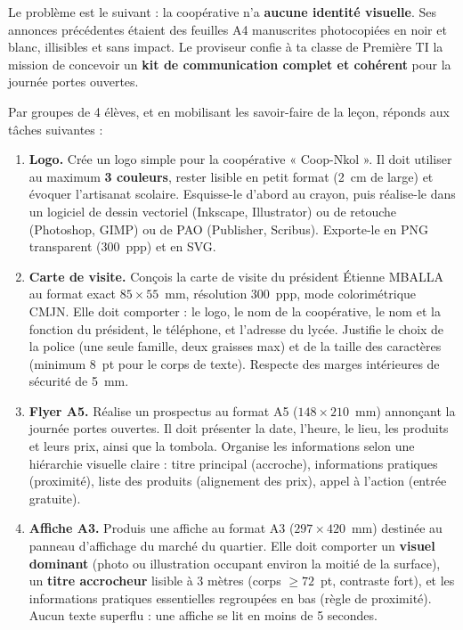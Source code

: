 \documentclass[11pt]{article}
\newcommand{\cle}[1]{{\popxbold\color{popdark}#1}}
\newcounter{popsec}
\newcounter{popsub}
\newcommand{\courssub}[1]{%
  \stepcounter{popsub}%
  \par\vspace{9pt}\noindent{\popxbold\fontsize{11.5}{13}\selectfont\color{popink}{\color{poporange}\thepopsec.\thepopsub}\hspace{6pt}#1}\par\nopagebreak\vspace{4pt}
}
\begin{document}
Le problème est le suivant : la coopérative n'a \textbf{aucune identité visuelle}. Ses annonces précédentes étaient des feuilles A4 manuscrites photocopiées en noir et blanc, illisibles et sans impact. Le proviseur confie à ta classe de Première TI la mission de concevoir un \textbf{kit de communication complet et cohérent} pour la journée portes ouvertes.

\courssub{Consignes}

Par groupes de 4 élèves, et en mobilisant les savoir-faire de la leçon, réponds aux tâches suivantes :

\begin{enumerate}
  \item \textbf{Logo.} Crée un logo simple pour la coopérative « Coop-Nkol ». Il doit utiliser au maximum \textbf{3 couleurs}, rester lisible en petit format (2~cm de large) et évoquer l'artisanat scolaire. Esquisse-le d'abord au crayon, puis réalise-le dans un logiciel de dessin vectoriel (Inkscape, Illustrator) ou de retouche (Photoshop, GIMP) ou de PAO (Publisher, Scribus). Exporte-le en PNG transparent (300~ppp) et en SVG.
  \item \textbf{Carte de visite.} Conçois la carte de visite du président Étienne MBALLA au format exact $85 \times 55$~mm, résolution 300~ppp, mode colorimétrique CMJN. Elle doit comporter : le logo, le nom de la coopérative, le nom et la fonction du président, le téléphone, et l'adresse du lycée. Justifie le choix de la police (une seule famille, deux graisses max) et de la taille des caractères (minimum 8~pt pour le corps de texte). Respecte des marges intérieures de sécurité de 5~mm.
  \item \textbf{Flyer A5.} Réalise un prospectus au format A5 ($148 \times 210$~mm) annonçant la journée portes ouvertes. Il doit présenter la date, l'heure, le lieu, les produits et leurs prix, ainsi que la tombola. Organise les informations selon une \cle{hiérarchie visuelle} claire : titre principal (accroche), informations pratiques (proximité), liste des produits (alignement des prix), appel à l'action (entrée gratuite).
  \item \textbf{Affiche A3.} Produis une affiche au format A3 ($297 \times 420$~mm) destinée au panneau d'affichage du marché du quartier. Elle doit comporter un \textbf{visuel dominant} (photo ou illustration occupant environ la moitié de la surface), un \textbf{titre accrocheur} lisible à 3 mètres (corps $\ge 72$~pt, contraste fort), et les informations pratiques essentielles regroupées en bas (règle de proximité). Aucun texte superflu : une affiche se lit en moins de 5 secondes.

\end{enumerate}
\end{document}
